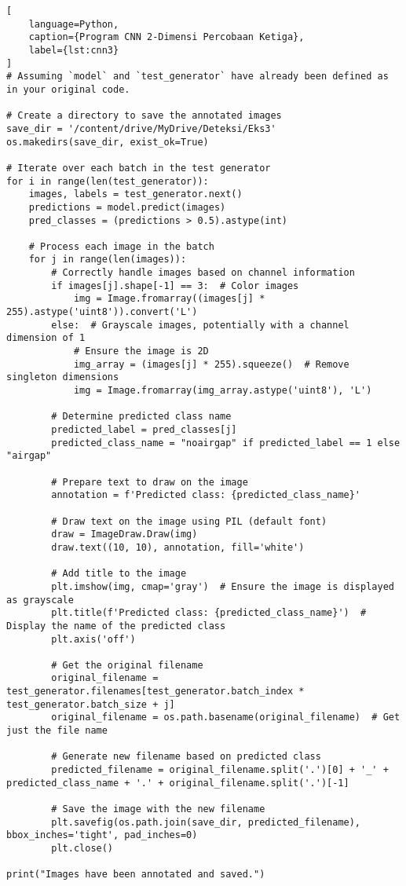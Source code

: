 \begin{lstlisting}[
    language=Python,
    caption={Program CNN 2-Dimensi Percobaan Ketiga},
    label={lst:cnn3}
]
# Assuming `model` and `test_generator` have already been defined as in your original code.

# Create a directory to save the annotated images
save_dir = '/content/drive/MyDrive/Deteksi/Eks3'
os.makedirs(save_dir, exist_ok=True)

# Iterate over each batch in the test generator
for i in range(len(test_generator)):
    images, labels = test_generator.next()
    predictions = model.predict(images)
    pred_classes = (predictions > 0.5).astype(int)

    # Process each image in the batch
    for j in range(len(images)):
        # Correctly handle images based on channel information
        if images[j].shape[-1] == 3:  # Color images
            img = Image.fromarray((images[j] * 255).astype('uint8')).convert('L')
        else:  # Grayscale images, potentially with a channel dimension of 1
            # Ensure the image is 2D
            img_array = (images[j] * 255).squeeze()  # Remove singleton dimensions
            img = Image.fromarray(img_array.astype('uint8'), 'L')

        # Determine predicted class name
        predicted_label = pred_classes[j]
        predicted_class_name = "noairgap" if predicted_label == 1 else "airgap"

        # Prepare text to draw on the image
        annotation = f'Predicted class: {predicted_class_name}'

        # Draw text on the image using PIL (default font)
        draw = ImageDraw.Draw(img)
        draw.text((10, 10), annotation, fill='white')

        # Add title to the image
        plt.imshow(img, cmap='gray')  # Ensure the image is displayed as grayscale
        plt.title(f'Predicted class: {predicted_class_name}')  # Display the name of the predicted class
        plt.axis('off')

        # Get the original filename
        original_filename = test_generator.filenames[test_generator.batch_index * test_generator.batch_size + j]
        original_filename = os.path.basename(original_filename)  # Get just the file name

        # Generate new filename based on predicted class
        predicted_filename = original_filename.split('.')[0] + '_' + predicted_class_name + '.' + original_filename.split('.')[-1]

        # Save the image with the new filename
        plt.savefig(os.path.join(save_dir, predicted_filename), bbox_inches='tight', pad_inches=0)
        plt.close()

print("Images have been annotated and saved.")
\end{lstlisting}


